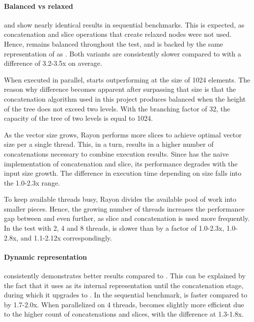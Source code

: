 
\paragraph{Balanced vs relaxed}
\rbvec{} and \rrbvec{} show nearly identical results in sequential benchmarks. This is expected, as concatenation and slice operations that create relaxed nodes were not used. Hence, \rrbvec{} remains balanced throughout the test, and is backed by the same representation of \rrbtree{} as \rbvec{}. Both variants are consistently slower compared to \stdvec{} with a difference of 3.2-3.5x on average. 

When executed in parallel, \rrbvec{} starts outperforming \rbvec{} at the size of 1024 elements. The reason why difference becomes apparent after surpassing that size is that the concatenation algorithm used in this project produces balanced \rbtree{} when the height of the tree does not exceed two levels. With the branching factor of 32, the capacity of the tree of two levels is equal to 1024. 

As the vector size grows, Rayon performs more slices to achieve optimal vector size per a single thread. This, in a turn, results in a higher number of concatenations necessary to combine execution results. Since \rbvec{} has the naive implementation of concatenation and slice, its performance degrades with the input size growth. The difference in execution time depending on size falls into the 1.0-2.3x range. 

To keep available threads busy, Rayon divides the available pool of work into smaller pieces. Hence, the growing number of threads increases the performance gap between \rbvec{} and \rrbvec{} even further, as slice and concatenation is used more frequently. In the test with 2, 4 and 8 threads, \rbvec{} is slower than \rrbvec{} by a factor of 1.0-2.3x, 1.0-2.8x, and 1.1-2.12x correspondingly. 

\paragraph{Dynamic representation}
\pvec{} consistently demonstrates better results compared to \rrbvec{}. This can be explained by the fact that it uses \stdvec{} as its internal representation until the concatenation stage, during which it upgrades to \rrbvec{}. In the sequential benchmark, \pvec{} is faster compared to \rrbvec{} by 1.7-2.0x. When parallelized on 4 threads, \rrbvec{} becomes slightly more efficient due to the higher count of concatenations and slices, with the difference at 1.3-1.8x. 

